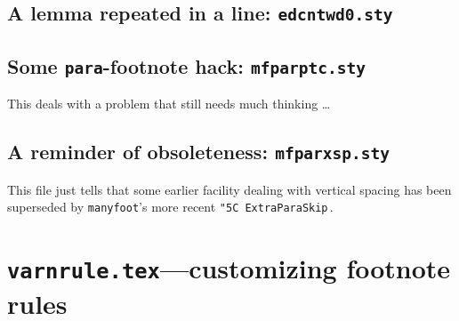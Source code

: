 \documentclass[10pt]{article}
\newcommand*{\cs}[1]{\texttt{\char"5C #1}}
\begin{document}
\subsection{A lemma repeated in a line: \texttt{edcntwd0.sty}}

\subsection{Some \texttt{para}-footnote hack: \texttt{mfparptc.sty}}
This deals with a problem that still needs much thinking \dots
\par

\subsection{A reminder of obsoleteness: \texttt{mfparxsp.sty}}
This file just tells that some earlier facility dealing with
vertical spacing has been superseded by \texttt{manyfoot}'s 
more recent \cs{ExtraParaSkip}\,.


\section{\texttt{varnrule.tex}---customizing footnote rules}

\end{document}
